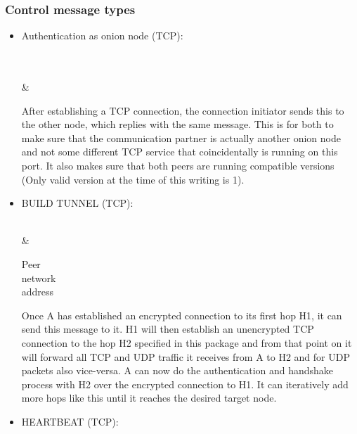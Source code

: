 \documentclass{article}
\begin{document}
\subsubsection{Control message types}
\begin{itemize}
	\item Authentication as onion node (TCP):
	
\begin{bytefield}[bitwidth=1.1em]{32}
	 \\
	 \\
	&  \\
\end{bytefield}
	
	After establishing a TCP connection, the connection initiator sends this to the other node, which replies with the same message. This is for both to make sure that the communication partner is actually another onion node and not some different TCP service that coincidentally is running on this port. It also makes sure that both peers are running compatible versions (Only valid version at the time of this writing is 1).
	
	\item BUILD TUNNEL (TCP): \\
	
	
\begin{bytefield}[bitwidth=2.2em]{16}
	 \\
		&  \\
\begin{rightwordgroup}{Peer\\ network\\ address}
		 \\
		\end{rightwordgroup}	
\end{bytefield}
Once A has established an encrypted connection to its first hop H1, it can send this message to it. H1 will then establish an unencrypted TCP connection to the hop H2 specified in this package and from that point on it will forward all TCP and UDP traffic it receives from A to H2 and for UDP packets also vice-versa. A can now do the authentication and handshake process with H2 over the encrypted connection to H1. It can iteratively add more hops like this until it reaches the desired target node.


\item HEARTBEAT (TCP): \\


\end{itemize}
\end{document}
